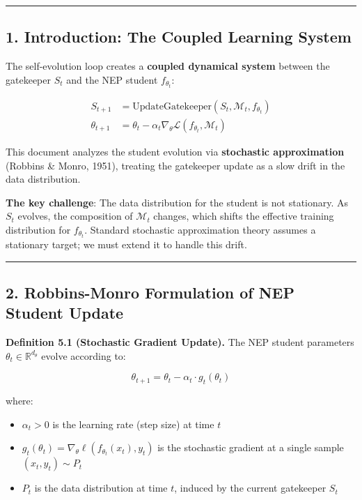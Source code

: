 \documentclass[
  12pt,
]{article}
\providecommand{\tightlist}{%
  \setlength{\itemsep}{0pt}\setlength{\parskip}{0pt}}
\begin{document}
\begin{center}\rule{0.5\linewidth}{0.5pt}\end{center}

\subsection{1. Introduction: The Coupled Learning
System}\label{introduction-the-coupled-learning-system}

The self-evolution loop creates a \textbf{coupled dynamical system}
between the gatekeeper \(S_t\) and the NEP student \(f_{\theta_t}\):

\[
\begin{aligned}
S_{t+1} &= \text{UpdateGatekeeper}(S_t, \mathcal{M}_t, f_{\theta_t}) \\
\theta_{t+1} &= \theta_t - \alpha_t \nabla_\theta \mathcal{L}(f_{\theta_t}, \mathcal{M}_t)
\end{aligned}
\]

This document analyzes the student evolution via \textbf{stochastic
approximation} (Robbins \& Monro, 1951), treating the gatekeeper update
as a slow drift in the data distribution.

\textbf{The key challenge}: The data distribution for the student is not
stationary. As \(S_t\) evolves, the composition of \(\mathcal{M}_t\)
changes, which shifts the effective training distribution for
\(f_{\theta_t}\). Standard stochastic approximation theory assumes a
stationary target; we must extend it to handle this drift.

\begin{center}\rule{0.5\linewidth}{0.5pt}\end{center}

\subsection{2. Robbins-Monro Formulation of NEP Student
Update}\label{robbins-monro-formulation-of-nep-student-update}

\textbf{Definition 5.1 (Stochastic Gradient Update).} The NEP student
parameters \(\theta_t \in \mathbb{R}^{d_\theta}\) evolve according to:

\[
\theta_{t+1} = \theta_t - \alpha_t \cdot g_t(\theta_t)
\]

where:

\begin{itemize}
\tightlist
\item
  \(\alpha_t > 0\) is the learning rate (step size) at time \(t\)
\item
  \(g_t(\theta_t) = \nabla_\theta \ell(f_{\theta_t}(x_t), y_t)\) is the
  stochastic gradient at a single sample \((x_t, y_t) \sim P_t\)
\item
  \(P_t\) is the data distribution at time \(t\), induced by the current
  gatekeeper \(S_t\)
\end{itemize}
\end{document}
